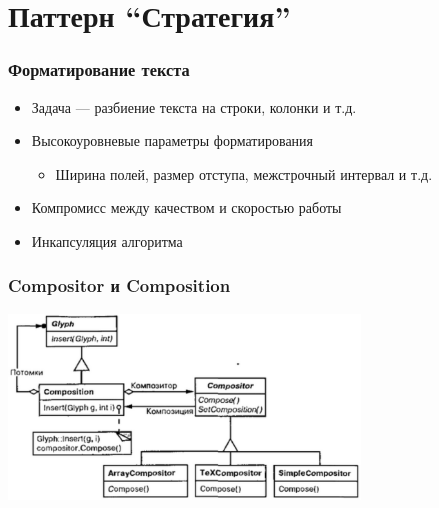 \documentclass{../../slides-style}
\begin{document}
    \section{Паттерн ``Стратегия''}

    \begin{frame}
        \frametitle{Форматирование текста}
        \begin{itemize}
            \item Задача --- разбиение текста на строки, колонки и т.д.
            \item Высокоуровневые параметры форматирования
            \begin{itemize}
                \item Ширина полей, размер отступа, межстрочный интервал и т.д.
            \end{itemize}
            \item Компромисс между качеством и скоростью работы
            \item Инкапсуляция алгоритма
        \end{itemize}
    \end{frame}

    \begin{frame}
        \frametitle{Compositor и Composition}
        \begin{center}
            \includegraphics[width=0.7\textwidth]{compositor.png}
        \end{center}
    \end{frame}
\end{document}
